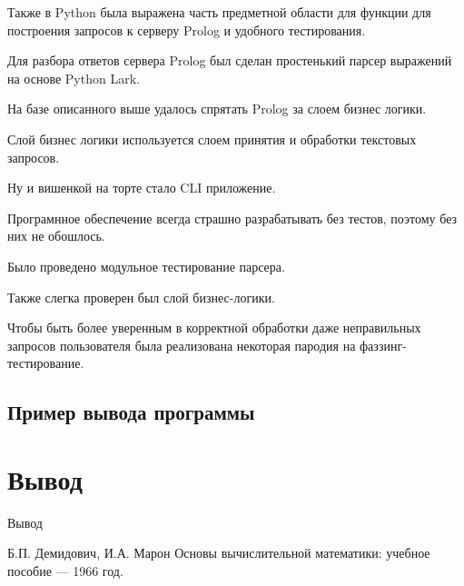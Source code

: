 \documentclass{article}
\begin{document}


Также в Python была выражена часть предметной области для
функции для построения запросов к серверу Prolog и
удобного тестирования.



Для разбора ответов сервера Prolog был сделан простенький
парсер выражений на основе Python Lark.



На базе описанного выше удалось спрятать Prolog за слоем
бизнес логики.



Слой бизнес логики используется слоем принятия и обработки
текстовых запросов.



Ну и вишенкой на торте стало CLI приложение.





Програмнное обеспечение всегда страшно разрабатывать без тестов,
поэтому без них не обошлось.

Было проведено модульное тестирование парсера.



Также слегка проверен был слой бизнес-логики.



Чтобы быть более уверенным в корректной обработки
даже неправильных запросов пользователя была реализована
некоторая пародия на фаззинг-тестирование.



\subsection{Пример вывода программы}



\section{Вывод}
Вывод

\begin{thebibliography}{9}

  Б.П. Демидович, И.А. Марон Основы вычислительной математики:
  учебное пособие — 1966 год.

\end{thebibliography}
\end{document}
